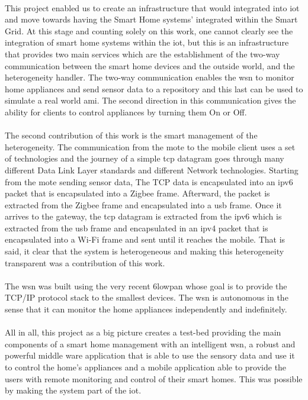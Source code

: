 \documentclass[oneside,12pt,a4paper,final]{book}
\begin{document}
\paragraph{}
This project enabled us to create an infrastructure that would integrated into \gls{iot} and move towards having the Smart Home systems' integrated within the Smart Grid. At this stage and counting solely on this work, one cannot clearly see the integration of smart home systems within the \gls{iot}, but this is an infrastructure that provides two main services which are the establishment of the two-way communication between the smart home devices and the outside world, and the heterogeneity handler. The two-way communication enables the \gls{wsn} to monitor home appliances and send sensor data to a repository and this last can be used to simulate a real world \gls{ami}. The second direction in this communication gives the ability for clients to control appliances by turning them On or Off.
\paragraph{}
The second contribution of this work is the smart management of the heterogeneity. The communication from the mote to the mobile client uses a set of technologies and the journey of a simple \gls{tcp} datagram goes through many different Data Link Layer standards and different Network technologies. Starting from the mote sending sensor data, The TCP data is encapsulated into an \gls{ipv6} packet that is encapsulated into a Zigbee frame. Afterward, the packet is extracted from the Zigbee frame and encapsulated into a \gls{usb} frame. Once it arrives to the gateway, the \gls{tcp} datagram is extracted from the \gls{ipv6} which is extracted from the \gls{usb} frame and encapsulated in an \gls{ipv4} packet that is encapsulated into a Wi-Fi frame and sent until it reaches the mobile. That is said, it clear that the system is heterogeneous and making this heterogeneity transparent was a contribution of this work.
\paragraph{}
The \gls{wsn} was built using the very recent \gls{6lowpan} whose goal is to provide the TCP/IP protocol stack to the smallest devices. The \gls{wsn} is autonomous in the sense that it can monitor the home appliances independently and indefinitely. 
\paragraph{}
All in all, this project as a big picture creates a test-bed providing the main components of a smart home management with an intelligent \gls{wsn}, a robust and powerful middle ware application that is able to use the sensory data and use it to control the home's appliances and a mobile application able to provide the users with remote monitoring and control of their smart homes. This was possible by making the system part of the \gls{iot}.
\end{document}
